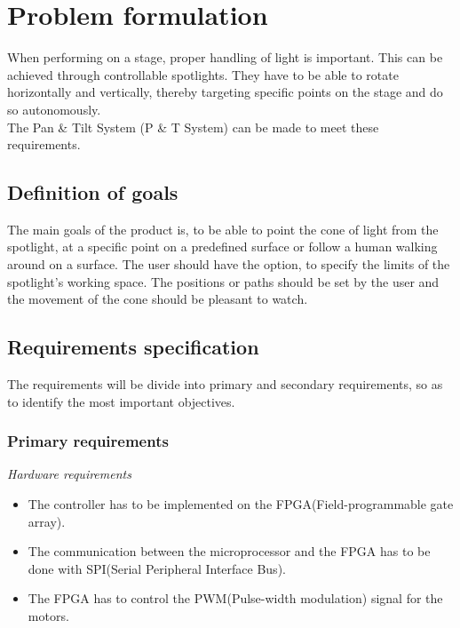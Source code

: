 \newpage

\section{Problem formulation}

When performing on a stage, proper handling of light is important. This can be achieved through controllable spotlights. They have to be able to rotate horizontally and vertically, thereby targeting specific points on the stage and do so autonomously.\\
The Pan \& Tilt System (P \& T System) can be made to meet these requirements.


\subsection{Definition of goals}
The main goals of the product is, to be able to point the cone of light from the spotlight, at a specific point on a predefined surface or follow a human walking around on a surface. The user should have the option, to specify the limits of the spotlight's working space. The positions or paths should be set by the user and the movement of the cone should be pleasant to watch.


\subsection{Requirements specification}
\label{sec:RequirementsSpecification}

The requirements will be divide into primary and secondary requirements, so as to identify the most important objectives.


\subsubsection{Primary requirements}
\label{sec:Primaryrequirements}

\textit{Hardware requirements}

\begin{itemize}

\item The controller has to be implemented on the FPGA(Field-programmable gate array).

\item The communication between the microprocessor and the FPGA has to be done with SPI(Serial Peripheral Interface Bus).

\item The FPGA has to control the PWM(Pulse-width modulation) signal for the motors.
\end{itemize}


